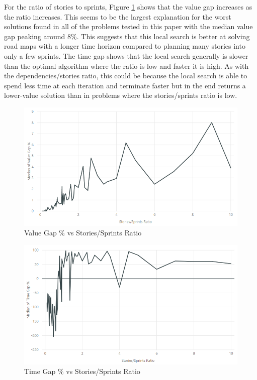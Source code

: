 For the ratio of stories to sprints, Figure \ref{fig:value_gap_vs_stories_sprints} shows that the value gap increases as the ratio increases. This seems to be the largest explanation for the worst solutions found in all of the problems tested in this paper with the median value gap peaking around 8\%. This suggests that this local search is better at solving road maps with a longer time horizon compared to planning many stories into only a few sprints. The time gap shows that the local search generally is slower than the optimal algorithm where the ratio is low and faster it is high. As with the dependencies/stories ratio, this could be because the local search is able to spend less time at each iteration and terminate faster but in the end returns a lower-value solution than in problems where the stories/sprints ratio is low.

\begin{figure}[h!]
    \centering
    \includegraphics[width=\textwidth]{Figures/Results/annealing_value_gap_stories_sprints.png}
    \caption{Value Gap \% vs Stories/Sprints Ratio}
    \label{fig:value_gap_vs_stories_sprints}
\end{figure}

\begin{figure}[h!]
    \centering
    \includegraphics[width=\textwidth]{Figures/Results/annealing_time_gap_stories_sprints.png}
    \caption{Time Gap \% vs Stories/Sprints Ratio}
    \label{fig:time_gap_vs_stories_sprints}
\end{figure}